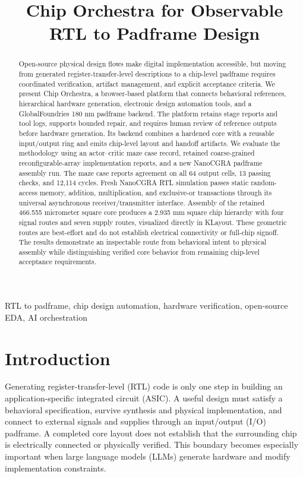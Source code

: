 ﻿\documentclass[conference,letterpaper]{IEEEtran}
\title{Chip Orchestra for Observable RTL to Padframe Design}
\author{\IEEEauthorblockN{Ade Irman Budi Hendrawan, William Anthony, Rifky Afriadi, Radhian Ferel Armansyah}
\IEEEauthorblockA{School of Electrical Engineering and Informatics\\Bandung Institute of Technology (ITB)\\Bandung, Indonesia\\
\{adeirman2705, willomooi, rifki.afriyadi, radhianarmansyah\}@gmail.com}}
\begin{document}
\maketitle
\begin{abstract}
Open-source physical design flows make digital implementation accessible, but moving from generated register-transfer-level descriptions to a chip-level padframe requires coordinated verification, artifact management, and explicit acceptance criteria. We present Chip Orchestra, a browser-based platform that connects behavioral references, hierarchical hardware generation, electronic design automation tools, and a GlobalFoundries 180 nm padframe backend. The platform retains stage reports and tool logs, supports bounded repair, and requires human review of reference outputs before hardware generation. Its backend combines a hardened core with a reusable input/output ring and emits chip-level layout and handoff artifacts. We evaluate the methodology using an actor--critic maze case record, retained coarse-grained reconfigurable-array implementation reports, and a new NanoCGRA padframe assembly run. The maze case reports agreement on all 64 output cells, 13 passing checks, and 12,114 cycles. Fresh NanoCGRA RTL simulation passes static random-access memory, addition, multiplication, and exclusive-or transactions through its universal asynchronous receiver/transmitter interface. Assembly of the retained 466.555 micrometer square core produces a 2.935 mm square chip hierarchy with four signal routes and seven supply routes, visualized directly in KLayout. These geometric routes are best-effort and do not establish electrical connectivity or full-chip signoff. The results demonstrate an inspectable route from behavioral intent to physical assembly while distinguishing verified core behavior from remaining chip-level acceptance requirements.
\end{abstract}
\begin{IEEEkeywords}
RTL to padframe, chip design automation, hardware verification, open-source EDA, AI orchestration
\end{IEEEkeywords}

\section{Introduction}
Generating register-transfer-level (RTL) code is only one step in building an application-specific integrated circuit (ASIC). A useful design must satisfy a behavioral specification, survive synthesis and physical implementation, and connect to external signals and supplies through an input/output (I/O) padframe. A completed core layout does not establish that the surrounding chip is electrically connected or physically verified. This boundary becomes especially important when large language models (LLMs) generate hardware and modify implementation constraints.
\end{document}
